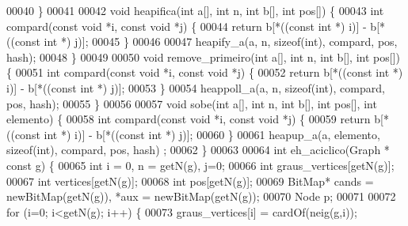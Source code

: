 \begin{DoxyCode}
00040  \}
00041 
00042 \textcolor{keywordtype}{void} heapifica(\textcolor{keywordtype}{int} a[], \textcolor{keywordtype}{int} n, \textcolor{keywordtype}{int} b[], \textcolor{keywordtype}{int} pos[]) \{
00043   \textcolor{keywordtype}{int} compard(\textcolor{keyword}{const} \textcolor{keywordtype}{void} *i, \textcolor{keyword}{const} \textcolor{keywordtype}{void} *j) \{
00044     \textcolor{keywordflow}{return} b[*((\textcolor{keyword}{const} \textcolor{keywordtype}{int} *) i)] - b[*((\textcolor{keyword}{const} \textcolor{keywordtype}{int} *) j)];
00045   \}
00046   
00047   heapify_a(a, n, \textcolor{keyword}{sizeof}(\textcolor{keywordtype}{int}), compard, pos, hash);
00048 \}
00049 
00050 \textcolor{keywordtype}{void} remove\_primeiro(\textcolor{keywordtype}{int} a[], \textcolor{keywordtype}{int} n, \textcolor{keywordtype}{int} b[], \textcolor{keywordtype}{int} pos[]) \{
00051   \textcolor{keywordtype}{int} compard(\textcolor{keyword}{const} \textcolor{keywordtype}{void} *i, \textcolor{keyword}{const} \textcolor{keywordtype}{void} *j) \{
00052     \textcolor{keywordflow}{return} b[*((\textcolor{keyword}{const} \textcolor{keywordtype}{int} *) i)] - b[*((\textcolor{keyword}{const} \textcolor{keywordtype}{int} *) j)];
00053   \}
00054   heappoll_a(a, n, \textcolor{keyword}{sizeof}(\textcolor{keywordtype}{int}), compard, pos, hash);
00055 \}
00056 
00057 \textcolor{keywordtype}{void} sobe(\textcolor{keywordtype}{int} a[], \textcolor{keywordtype}{int} n, \textcolor{keywordtype}{int} b[], \textcolor{keywordtype}{int} pos[], \textcolor{keywordtype}{int} elemento) \{
00058   \textcolor{keywordtype}{int} compard(\textcolor{keyword}{const} \textcolor{keywordtype}{void} *i, \textcolor{keyword}{const} \textcolor{keywordtype}{void} *j) \{
00059     \textcolor{keywordflow}{return} b[*((\textcolor{keyword}{const} \textcolor{keywordtype}{int} *) i)] - b[*((\textcolor{keyword}{const} \textcolor{keywordtype}{int} *) j)];
00060   \}
00061   heapup_a(a, elemento, \textcolor{keyword}{sizeof}(\textcolor{keywordtype}{int}), compard, pos, hash) ;
00062 \}
00063 
00064 \textcolor{keywordtype}{int} eh_aciclico(Graph * \textcolor{keyword}{const} g) \{
00065         \textcolor{keywordtype}{int} i = 0, n = getN(g), j=0;
00066         \textcolor{keywordtype}{int} graus\_vertices[getN(g)];
00067         \textcolor{keywordtype}{int} vertices[getN(g)];
00068         \textcolor{keywordtype}{int} pos[getN(g)];
00069         BitMap* cands = newBitMap(getN(g)), *aux = newBitMap(getN(g));
00070         Node p;
00071 
00072         \textcolor{keywordflow}{for} (i=0; i<getN(g); i++) \{
00073                 graus\_vertices[i] = cardOf(neig(g,i));

\end{DoxyCode}
